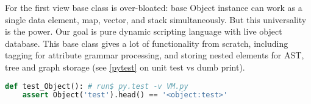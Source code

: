 \noindent
For the first view base class is over-bloated: base Object instance can work as
a single data element, map, vector, and stack simultaneously. But this
universality is the power. Our goal is pure dynamic scripting language with live
object database. This base class gives a lot of functionality from scratch,
including tagging for attribute grammar processing, and storing nested elements
for AST, tree and graph storage (see \ref{pytest} on unit test vs dumb print).

\begin{lstlisting}[language=Python]
def test_Object(): # run$ py.test -v VM.py
	assert Object('test').head() == '<object:test>'
\end{lstlisting}



\secup